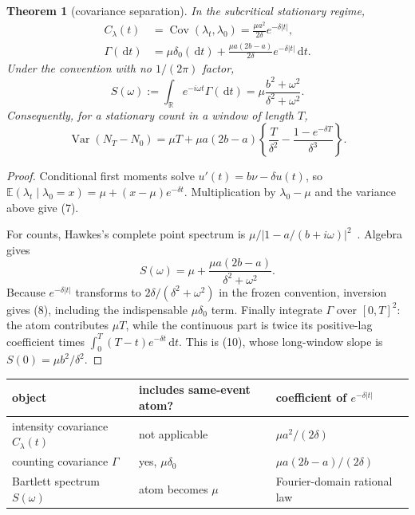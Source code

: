 \documentclass[10pt]{article}
\newtheorem{theorem}{Theorem}
\newcommand{\E}{\mathbb E}
\newcommand{\Cov}{\operatorname{Cov}}
\newcommand{\Var}{\operatorname{Var}}
\newcommand{\dd}{\,\mathrm d}
\begin{document}
\begin{theorem}[covariance separation]
In the subcritical stationary regime,
\begin{align}
 C_\lambda(t)&=\Cov(\lambda_t,\lambda_0)
   =\frac{\mu a^2}{2\delta}e^{-\delta|t|},             \tag{7}\\
 \Gamma(\dd t)&=\mu\delta_0(\dd t)
   +\frac{\mu a(2b-a)}{2\delta}e^{-\delta|t|}\dd t.  \tag{8}
\end{align}
Under the convention with no $1/(2\pi)$ factor,
\begin{equation}
 S(\omega):=\int_{\mathbb R}e^{-i\omega t}\Gamma(\dd t)
   =\mu\frac{b^2+\omega^2}{\delta^2+\omega^2}.        \tag{9}
\end{equation}
Consequently, for a stationary count in a window of length $T$,
\begin{equation}
 \Var(N_T-N_0)=\mu T+\mu a(2b-a)
 \left\{\frac{T}{\delta^2}-
 \frac{1-e^{-\delta T}}{\delta^3}\right\}.           \tag{10}
\end{equation}
\end{theorem}
\begin{proof}
Conditional first moments solve
$u'(t)=b\nu-\delta u(t)$, so
$\E(\lambda_t\mid\lambda_0=x)=\mu+(x-\mu)e^{-\delta t}$.
Multiplication by $\lambda_0-\mu$ and the variance above give (7).

For counts, Hawkes's complete point spectrum is
$\mu/|1-a/(b+i\omega)|^2$~\cite{Hawkes1971}.  Algebra gives
\[
 S(\omega)=\mu+\frac{\mu a(2b-a)}{\delta^2+\omega^2}.
\]
Because $e^{-\delta|t|}$ transforms to
$2\delta/(\delta^2+\omega^2)$ in the frozen convention, inversion gives
(8), including the indispensable $\mu\delta_0$ term.  Finally integrate
$\Gamma$ over $[0,T]^2$: the atom contributes $\mu T$, while the continuous
part is twice its positive-lag coefficient times
$\int_0^T(T-t)e^{-\delta t}\dd t$.  This is (10), whose long-window slope
is $S(0)=\mu b^2/\delta^2$.
\end{proof}

\begin{center}
\begin{tabular}{lll}
\toprule
object & includes same-event atom? & coefficient of $e^{-\delta|t|}$\\
\midrule
intensity covariance $C_\lambda(t)$ & not applicable & $\mu a^2/(2\delta)$\\
counting covariance $\Gamma$ & yes, $\mu\delta_0$ & $\mu a(2b-a)/(2\delta)$\\
Bartlett spectrum $S(\omega)$ & atom becomes $\mu$ & Fourier-domain rational law\\
\bottomrule
\end{tabular}
\end{center}
\fi
\end{document}
